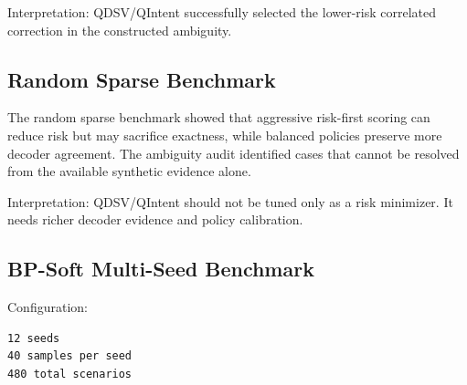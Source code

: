 \documentclass[11pt]{article}
\begin{document}
Interpretation: QDSV/QIntent successfully selected the lower-risk correlated correction in the constructed ambiguity.


\subsection{Random Sparse Benchmark}

The random sparse benchmark showed that aggressive risk-first scoring can reduce risk but may sacrifice exactness, while balanced policies preserve more decoder agreement. The ambiguity audit identified cases that cannot be resolved from the available synthetic evidence alone.


Interpretation: QDSV/QIntent should not be tuned only as a risk minimizer. It needs richer decoder evidence and policy calibration.


\subsection{BP-Soft Multi-Seed Benchmark}

Configuration:


\begin{lstlisting}
12 seeds
40 samples per seed
480 total scenarios
\end{lstlisting}
\end{document}
